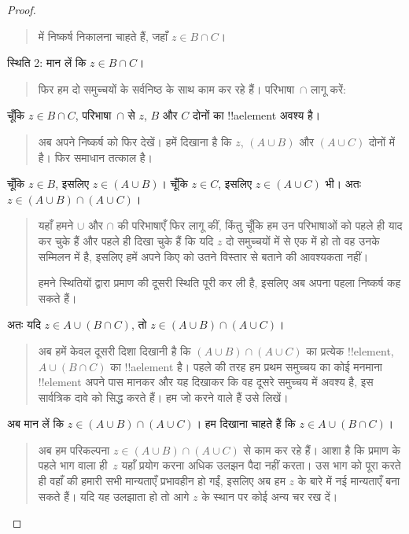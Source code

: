 \documentclass[../../../include/open-logic-section]{subfiles}
\begin{document}
\begin{proof}
\begin{quote}
में निष्कर्ष निकालना चाहते हैं, जहाँ $z \in B \cap C$।
\end{quote}
स्थिति 2: मान लें कि $z \in B \cap C$।
\begin{quote}
फिर हम दो समुच्चयों के सर्वनिष्ठ के साथ काम कर रहे हैं। परिभाषा~$\cap$ लागू
करें:
\end{quote}
चूँकि $z \in B \cap C$, परिभाषा~$\cap$ से $z$, $B$ और $C$ दोनों का
!!a{element} अवश्य है।
\begin{quote}
अब अपने निष्कर्ष को फिर देखें। हमें दिखाना है कि $z$, $(A \cup B)$ और
$(A \cup C)$ दोनों में है। फिर समाधान तत्काल है।
\end{quote}
चूँकि $z \in B$, इसलिए $z \in (A \cup B)$। चूँकि $z \in C$, इसलिए $z
\in (A \cup C)$ भी। अतः $z \in (A \cup B) \cap (A \cup C)$।
\begin{quote}
यहाँ हमने $\cup$ और $\cap$ की परिभाषाएँ फिर लागू कीं, किंतु चूँकि हम उन
परिभाषाओं को पहले ही याद कर चुके हैं और पहले ही दिखा चुके हैं कि यदि $z$ दो
समुच्चयों में से एक में हो तो वह उनके सम्मिलन में है, इसलिए हमें अपने किए को
उतने विस्तार से बताने की आवश्यकता नहीं।

हमने स्थितियों द्वारा प्रमाण की दूसरी स्थिति पूरी कर ली है, इसलिए अब अपना
पहला निष्कर्ष कह सकते हैं।
\end{quote}
अतः यदि $z \in A \cup (B \cap C)$, तो $z \in (A \cup B) \cap (A \cup
C)$।
\begin{quote}
अब हमें केवल दूसरी दिशा दिखानी है कि $(A \cup B) \cap (A \cup C)$ का
प्रत्येक !!{element}, $A \cup (B \cap C)$ का !!a{element} है। पहले की
तरह हम प्रथम समुच्चय का कोई मनमाना !!{element} अपने पास मानकर और यह दिखाकर
कि वह दूसरे समुच्चय में अवश्य है, इस सार्वत्रिक दावे को सिद्ध करते हैं। हम
जो करने वाले हैं उसे लिखें।
\end{quote}
अब मान लें कि $z \in (A \cup B) \cap (A \cup C)$। हम दिखाना चाहते हैं
कि $z \in A \cup (B \cap C)$।
\begin{quote}
अब हम परिकल्पना $z \in (A \cup B) \cap (A \cup C)$ से काम कर रहे हैं।
आशा है कि प्रमाण के पहले भाग वाला ही~$z$ यहाँ प्रयोग करना अधिक उलझन पैदा
नहीं करता। उस भाग को पूरा करते ही वहाँ की हमारी सभी मान्यताएँ प्रभावहीन हो
गईं, इसलिए अब हम $z$ के बारे में नई मान्यताएँ बना सकते हैं। यदि यह उलझाता
हो तो आगे $z$ के स्थान पर कोई अन्य चर रख दें।


\end{quote}
\end{proof}
\end{document}

